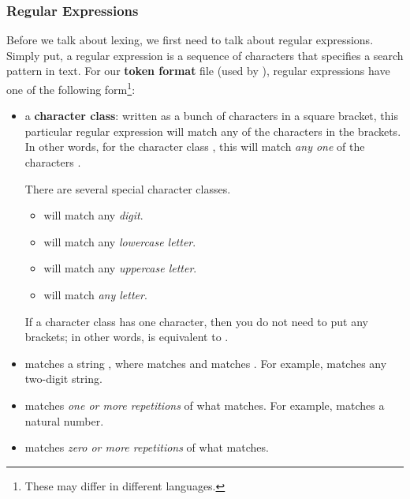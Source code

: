\documentclass[letterpaper]{article}
\begin{document}
\subsubsection{Regular Expressions}
Before we talk about lexing, we first need to talk about regular expressions. Simply put, a regular expression is a sequence of characters that specifies a search pattern in text. For our \textbf{token format} file (used by ), regular expressions have one of the following form\footnote{These may differ in different languages.}: 
\begin{itemize}
    \item a \textbf{character class}: written as a bunch of characters in a square bracket, this particular regular expression will match any of the characters in the brackets. In other words, for the character class \code{[c1 c2 ... cn]}, this will match \emph{any one} of the characters . 
    
    \bigskip 

    There are several special character classes. 
    \begin{itemize}
        \item \code{[0-9]} will match any \emph{digit}.
        \item \code{[a-z]} will match any \emph{lowercase letter}.
        \item \code{[A-Z]} will match any \emph{uppercase letter}.
        \item \code{[a-z A-Z]} will match \emph{any letter}. 
    \end{itemize}
    If a character class has one character, then you do not need to put any brackets; in other words, \code{[c1]} is equivalent to . 

    \item {} matches a string , where  matches  and  matches . For example, \code{[0-9] [0-9]} matches any two-digit string. 

    \item {} matches \emph{one or more repetitions} of what  matches. For example, \code{[0-9]+} matches a natural number. 
    
    \item {} matches \emph{zero or more repetitions} of what  matches. 
\end{itemize}
\end{document}
